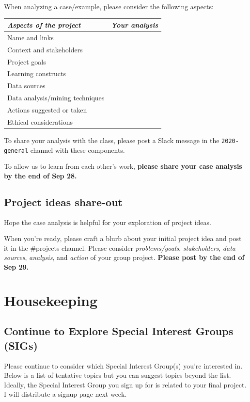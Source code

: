 \documentclass[
]{book}
\begin{document}
When analyzing a case/example, please consider the following aspects:

\begin{longtable}[]{@{}ll@{}}
\toprule
\emph{Aspects of the project} & \emph{Your analysis}\tabularnewline
\midrule
\endhead
Name and links &\tabularnewline
Context and stakeholders &\tabularnewline
Project goals &\tabularnewline
Learning constructs &\tabularnewline
Data sources &\tabularnewline
Data analysis/mining techniques &\tabularnewline
Actions suggested or taken &\tabularnewline
Ethical considerations &\tabularnewline
\bottomrule
\end{longtable}

To share your analysis with the class, please post a Slack message in the \texttt{2020-general} channel with these components.

To allow us to learn from each other's work, \textbf{please share your case analysis by the end of Sep 28.}

\hypertarget{project-ideas-share-out}{%
\subsection{Project ideas share-out}\label{project-ideas-share-out}}

Hope the case analysis is helpful for your exploration of project ideas.

When you're ready, please craft a blurb about your initial project idea and post it in the \#projects channel. Please consider \emph{problems/goals}, \emph{stakeholders}, \emph{data sources}, \emph{analysis}, and \emph{action} of your group project. \textbf{Please post by the end of Sep 29.}

\hypertarget{housekeeping}{%
\section{Housekeeping}\label{housekeeping}}

\hypertarget{continue-to-explore-special-interest-groups-sigs}{%
\subsection{Continue to Explore Special Interest Groups (SIGs)}\label{continue-to-explore-special-interest-groups-sigs}}

Please continue to consider which Special Interest Group(s) you're interested in. Below is a list of tentative topics but you can suggest topics beyond the list. Ideally, the Special Interest Group you sign up for is related to your final project. I will distribute a signup page next week.
\end{document}
